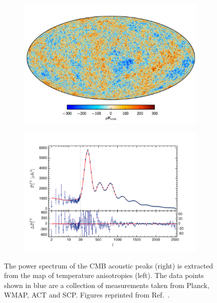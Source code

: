 \begin{figure}[!ht]
     \centering
     \begin{subfigure}{0.47\textwidth}
         \centering
         \includegraphics[width=\textwidth]{figures/DMOverview/CMBImg.png}
         \caption{}
         \label{fig:DMOverview/CMBImg}
     \end{subfigure}
     \hfill
     \begin{subfigure}{0.47\textwidth}
         \centering
         \includegraphics[width=\textwidth]{figures/DMOverview/CMBPS.png}
         \caption{}
         \label{fig:DMOverview/CMBPowerSpec}
     \end{subfigure}
     \caption[The power spectrum of the CMB acoustic peaks is extracted from the map of temperature anisotropies.]{The power spectrum of the CMB acoustic peaks (right) is extracted from the map of temperature anisotropies (left). The data points shown in blue are a collection of measurements taken from Planck, WMAP, ACT and SCP. Figures reprinted from Ref.~\cite{Cirelli:2024ssz}.}
     \label{fig:DMOverview/CMB}
\end{figure}
